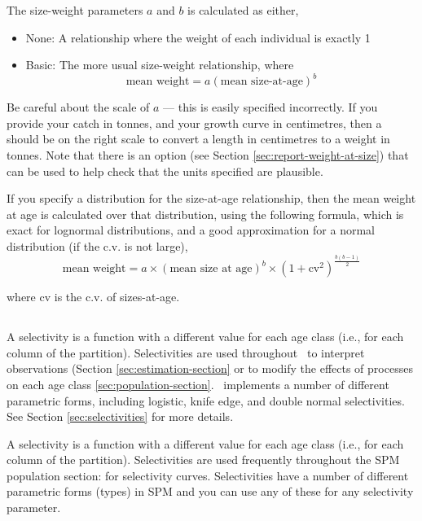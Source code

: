 The size-weight parameters $a$ and $b$ is calculated as either,
\begin{itemize}
  \item{None:} A relationship where the weight of each individual is exactly 1 
  \item{Basic:} The more usual size-weight relationship, where 
  \begin{equation}
    \text{mean weight}=a(\text{mean size-at-age})^b
  \end{equation}
\end{itemize}
  
Be careful about the scale of $a$ --- this is easily specified incorrectly. If you provide your catch in tonnes, and your growth curve in centimetres, then a should be on the right scale to convert a length in centimetres to a weight in tonnes. Note that there is an option  (see Section \ref{sec:report-weight-at-size}) that can be used to help check that the units specified are plausible.

If you specify a distribution for the size-at-age relationship, then the mean weight at age is calculated over that distribution, using the following formula, which is exact for lognormal distributions, and a good approximation for a normal distribution (if the c.v. is not large),
\begin{equation}
	\text{mean weight}=a \times (\text{mean size at age})^b \times \left( 1+\text{cv}^2 \right)^{\frac{b(b-1)}{2}}
\end{equation}

where cv is the c.v. of sizes-at-age.

\subsection{\label{sec:selectivities}}

A selectivity is a function with a different value for each age class (i.e., for each column of the partition). Selectivities are used throughout \SPM\ to interpret observations (Section \ref{sec:estimation-section} or to modify the effects of processes on each age class \ref{sec:population-section}. \SPM\ implements a number of different parametric forms, including logistic, knife edge, and double normal selectivities. See Section \ref{sec:selectivities} for more details.

A selectivity is a function with a different value for each age class (i.e., for each column of the partition). Selectivities are used frequently throughout the SPM population section: for selectivity curves. Selectivities have a number of different parametric forms (types) in SPM and you can use any of these for any selectivity parameter. 

